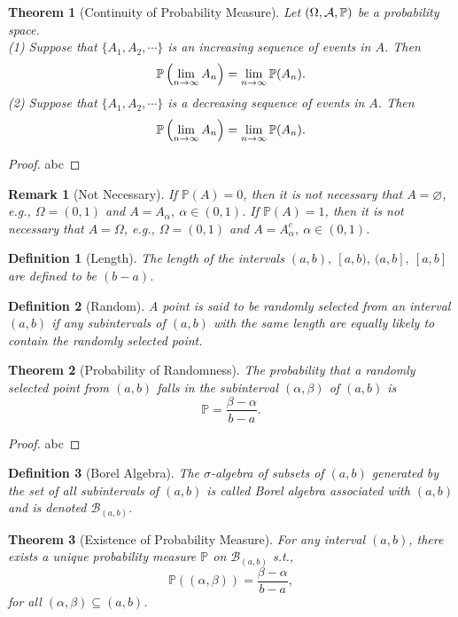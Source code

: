 \documentclass[openany,12pt]{book}
\newtheorem{theorem}{Theorem}[chapter]
\newtheorem{remark}{Remark}[chapter]
\newtheorem{definition}{Definition}[chapter]
\begin{document}
\begin{theorem}[Continuity of Probability Measure]
Let $(\Omega,\mathcal{A},\mathbb{P})$ be a probability space.\\
(1) Suppose that $\{A_1,A_2,\cdots\}$ is an increasing sequence of events in $A$. Then $$\mathbb{P}\left(\lim_{n\to\infty} A_n\right)=\lim_{n\to\infty} \mathbb{P}(A_n).$$
(2) Suppose that $\{A_1,A_2,\cdots\}$ is a decreasing sequence of events in $A$. Then $$\mathbb{P}\left(\lim_{n\to\infty} A_n\right)=\lim_{n\to\infty} \mathbb{P}(A_n).$$
\end{theorem}

\begin{proof}
  abc
\end{proof}

\begin{remark}[Not Necessary]
If $\mathbb{P}(A)=0$, then it is not necessary that $A=\varnothing$, e.g., $\Omega=(0,1)$ and $A=A_\alpha,\ \alpha\in(0,1)$.
If $\mathbb{P}(A)=1$, then it is not necessary that $A=\Omega$, e.g., $\Omega=(0,1)$ and $A=A_\alpha^c,\ \alpha\in(0,1)$.
\end{remark}

\begin{definition}[Length]
The length of the intervals $(a,b),\ [a,b),\ (a,b],\ [a,b]$ are defined to be $(b-a)$.
\end{definition}

\begin{definition}[Random]
A point is said to be randomly selected from an interval $(a,b)$ if any subintervals of $(a,b)$ with the same length are equally likely to contain the randomly selected point.
\end{definition}

\begin{theorem}[Probability of Randomness]
The probability that a randomly selected point from $(a,b)$ falls in the subinterval $(\alpha,\beta)$ of $(a,b)$ is $$\mathbb{P}=\frac{\beta-\alpha}{b-a}.$$
\end{theorem}

\begin{proof}
  abc
\end{proof}

\begin{definition}[Borel Algebra]
The $\sigma$-algebra of subsets of $(a,b)$ generated by the set of all subintervals of $(a,b)$ is called Borel algebra associated with $(a,b)$ and is denoted $\mathcal{B}_{(a,b)}$.
\end{definition}

\begin{theorem}[Existence of Probability Measure]
For any interval $(a,b)$, there exists a unique probability measure $\mathbb{P}$ on $\mathcal{B}_{(a,b)}$ s.t., $$\mathbb{P}((\alpha,\beta))=\frac{\beta-\alpha}{b-a},$$
for all $(\alpha,\beta)\subseteq(a,b)$.
\end{theorem}
\end{document}
